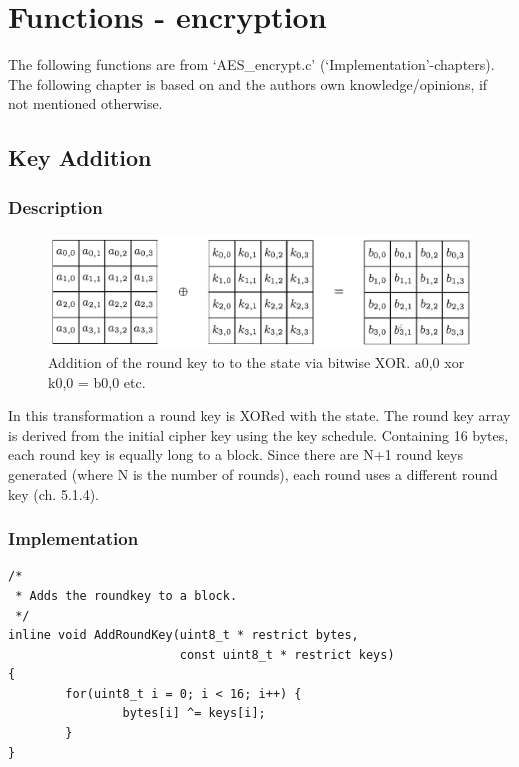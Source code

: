 \hypertarget{functions---encryption}{%
\section{Functions - encryption}\label{functions---encryption}}

The following functions are from `AES\_encrypt.c'
(`Implementation'-chapters). The following chapter is based on \cite{fips197} and the authors own
knowledge/opinions, if not mentioned otherwise.

\hypertarget{key-addition}{%
\subsection{Key Addition}\label{key-addition}}

\hypertarget{description-2}{%
\subsubsection{Description}\label{description-2}}

\begin{figure}
\centering
\includegraphics[scale = 0.3]{data/figures/addroundkey.png}
\caption{Addition of the round key to to the state via bitwise XOR. a0,0 xor k0,0 = b0,0 etc.}
\end{figure}

In this transformation a round key is
XORed with the state. The round key array is
derived from the initial cipher key using the key schedule. Containing
16 bytes, each round key is equally long to a block. Since there are N+1
round keys generated (where N is the number of rounds), each round uses
a different round key (ch. 5.1.4).

\hypertarget{implementation-2}{%
\subsubsection{Implementation}\label{implementation-2}}

\begin{lstlisting}
/*
 * Adds the roundkey to a block.
 */
inline void AddRoundKey(uint8_t * restrict bytes,
                        const uint8_t * restrict keys)
{
        for(uint8_t i = 0; i < 16; i++) {
                bytes[i] ^= keys[i];
        }
}
\end{lstlisting}

